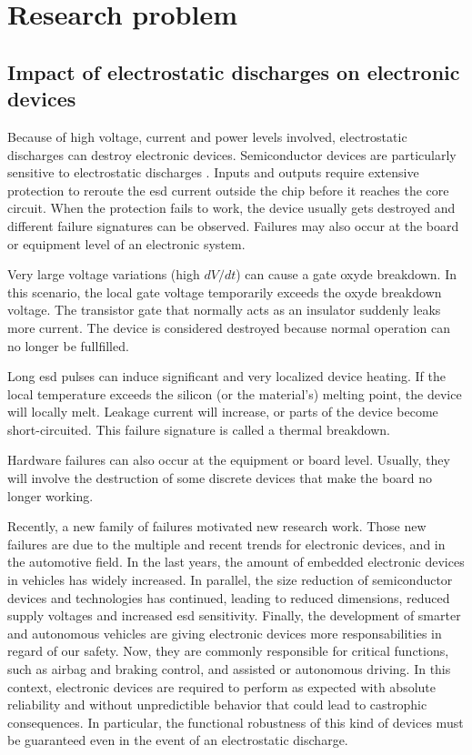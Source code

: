 \section{Research problem}
\subsection{Impact of electrostatic discharges on electronic devices}


Because of high voltage, current and power levels involved, electrostatic discharges can destroy electronic devices.
Semiconductor devices are particularly sensitive to electrostatic discharges \cite{impactESDsemiconductors}.
Inputs and outputs require extensive protection to reroute the \gls{esd} current outside the chip before it reaches the core circuit.
When the protection fails to work, the device usually gets destroyed and different failure signatures can be observed.
Failures may also occur at the board or equipment level of an electronic system.

Very large voltage variations (high $dV/dt$) can cause a gate oxyde breakdown.
In this scenario, the local gate voltage temporarily exceeds the oxyde breakdown voltage.
The transistor gate that normally acts as an insulator suddenly leaks more current.
The device is considered destroyed because normal operation can no longer be fullfilled.

Long \gls{esd} pulses can induce significant and very localized device heating.
If the local temperature exceeds the silicon (or the material's) melting point, the device will locally melt.
Leakage current will increase, or parts of the device become short-circuited.
This failure signature is called a thermal breakdown.

Hardware failures can also occur at the equipment or board level.
Usually, they will involve the destruction of some discrete devices that make the board no longer working.

Recently, a new family of failures motivated new research work.
Those new failures are due to the multiple and recent trends for electronic devices, and in the automotive field.
In the last years, the amount of embedded electronic devices in vehicles has widely increased.
In parallel, the size reduction of semiconductor devices and technologies has continued, leading to reduced dimensions, reduced supply voltages and increased \gls{esd} sensitivity.
Finally, the development of smarter and autonomous vehicles are giving electronic devices more responsabilities in regard of our safety.
Now, they are commonly responsible for critical functions, such as airbag and braking control, and assisted or autonomous driving.
In this context, electronic devices are required to perform as expected with absolute reliability and without unpredictible behavior that could lead to castrophic consequences.
In particular, the functional robustness of this kind of devices must be guaranteed even in the event of an electrostatic discharge.

